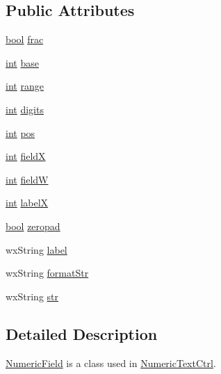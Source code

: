 \subsection*{Public Attributes}
\begin{DoxyCompactItemize}
\item 
\hyperlink{mac_2config_2i386_2lib-src_2libsoxr_2soxr-config_8h_abb452686968e48b67397da5f97445f5b}{bool} \hyperlink{class_numeric_field_adbaed9e5e7d3ebf39eba5957a4956c31}{frac}
\item 
\hyperlink{xmltok_8h_a5a0d4a5641ce434f1d23533f2b2e6653}{int} \hyperlink{class_numeric_field_a8fb95517ef01a98c5b32d9ef0e24585a}{base}
\item 
\hyperlink{xmltok_8h_a5a0d4a5641ce434f1d23533f2b2e6653}{int} \hyperlink{class_numeric_field_abf84e475674cb74bf9c854cb09239e4a}{range}
\item 
\hyperlink{xmltok_8h_a5a0d4a5641ce434f1d23533f2b2e6653}{int} \hyperlink{class_numeric_field_ae45a3a34c523f63f47ed94ea0edcd850}{digits}
\item 
\hyperlink{xmltok_8h_a5a0d4a5641ce434f1d23533f2b2e6653}{int} \hyperlink{class_numeric_field_adc3df0949424eb5225992d46f7d7a0e0}{pos}
\item 
\hyperlink{xmltok_8h_a5a0d4a5641ce434f1d23533f2b2e6653}{int} \hyperlink{class_numeric_field_a4c9620dd08456efe32168e87b86ca7ce}{fieldX}
\item 
\hyperlink{xmltok_8h_a5a0d4a5641ce434f1d23533f2b2e6653}{int} \hyperlink{class_numeric_field_a51ec24b02af9be49af04babd54086da3}{fieldW}
\item 
\hyperlink{xmltok_8h_a5a0d4a5641ce434f1d23533f2b2e6653}{int} \hyperlink{class_numeric_field_af2504f1934de37192849b98f396427f0}{labelX}
\item 
\hyperlink{mac_2config_2i386_2lib-src_2libsoxr_2soxr-config_8h_abb452686968e48b67397da5f97445f5b}{bool} \hyperlink{class_numeric_field_a3fdd5d26f5edd03c39ada91bc8137c73}{zeropad}
\item 
wx\+String \hyperlink{class_numeric_field_a365c04576a77909cf1caecb5494ce792}{label}
\item 
wx\+String \hyperlink{class_numeric_field_ac7c29c7a0347181883c49a22567e6e06}{format\+Str}
\item 
wx\+String \hyperlink{class_numeric_field_a47312fed26f52a67407bf71e117d7af0}{str}
\end{DoxyCompactItemize}


\subsection{Detailed Description}
\hyperlink{class_numeric_field}{Numeric\+Field} is a class used in \hyperlink{class_numeric_text_ctrl}{Numeric\+Text\+Ctrl}. 

